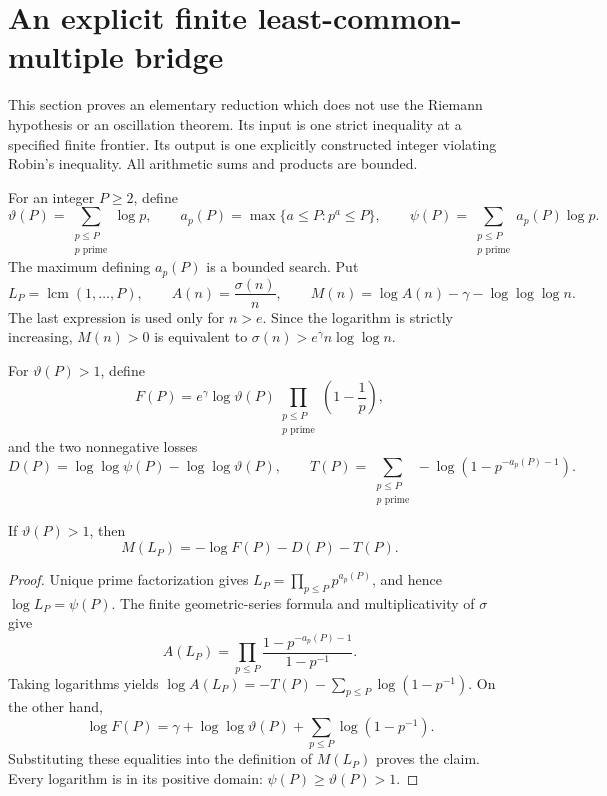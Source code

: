 \section{An explicit finite least-common-multiple bridge}

This section proves an elementary reduction which does not use the Riemann
hypothesis or an oscillation theorem. Its input is one strict inequality at
a specified finite frontier. Its output is one explicitly constructed integer
violating Robin's inequality. All arithmetic sums and products are bounded.

For an integer $P\ge2$, define
\[
 \vartheta(P)=\sum_{\substack{p\le P\\p\text{ prime}}}\log p,
 \qquad
 a_p(P)=\max\{a\le P:p^a\le P\},
 \qquad
 \psi(P)=\sum_{\substack{p\le P\\p\text{ prime}}}a_p(P)\log p.
\]
The maximum defining $a_p(P)$ is a bounded search. Put
\[
 L_P=\operatorname{lcm}(1,\ldots,P),\qquad
 A(n)=\frac{\sigma(n)}n,
 \qquad
 M(n)=\log A(n)-\gamma-\log\log\log n.
\]
The last expression is used only for $n>e$. Since the logarithm is strictly
increasing, $M(n)>0$ is equivalent to
$\sigma(n)>e^\gamma n\log\log n$.

For $\vartheta(P)>1$, define
\[
 F(P)=e^\gamma\log\vartheta(P)
       \prod_{\substack{p\le P\\p\text{ prime}}}\left(1-\frac1p\right),
\]
and the two nonnegative losses
\[
 D(P)=\log\log\psi(P)-\log\log\vartheta(P),
 \qquad
 T(P)=\sum_{\substack{p\le P\\p\text{ prime}}}
       -\log\left(1-p^{-a_p(P)-1}\right).
\]

\begin{lemma}
If $\vartheta(P)>1$, then
\[
 M(L_P)=-\log F(P)-D(P)-T(P).
\]
\end{lemma}
\begin{proof}
Unique prime factorization gives
$L_P=\prod_{p\le P}p^{a_p(P)}$, and hence $\log L_P=\psi(P)$.
The finite geometric-series formula and multiplicativity of $\sigma$ give
\[
 A(L_P)=\prod_{p\le P}
        \frac{1-p^{-a_p(P)-1}}{1-p^{-1}}.
\]
Taking logarithms yields
$\log A(L_P)=-T(P)-\sum_{p\le P}\log(1-p^{-1})$.
On the other hand,
\[
 \log F(P)=\gamma+\log\log\vartheta(P)
              +\sum_{p\le P}\log(1-p^{-1}).
\]
Substituting these equalities into the definition of $M(L_P)$ proves the
claim. Every logarithm is in its positive domain: $\psi(P)\ge\vartheta(P)>1$.
\end{proof}

